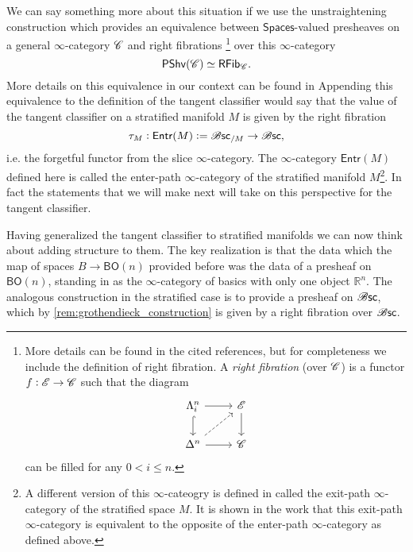 \documentclass[../text]{subfiles}
\begin{document}
\begin{remark}\label{rem:grothendieck_construction}
    We can say something more about this situation if we use the unstraightening construction \cite[sec.2.2]{lurie_htt} which provides an equivalence between $\mathsf{Spaces}$-valued presheaves on a general $\infty$-category $\mathscr{C}$ and right fibrations \footnote{More details can be found in the cited references, but for completeness we include the definition of right fibration. A \emph{right fibration} (over $\mathscr{C}$) is a functor $f:\mathscr{E} \rightarrow \mathscr{C}$ such that the diagram
    \begin{equation}
        \begin{tikzcd}[ampersand replacement=\&]
            \Lambda^n_i \arrow[r] \arrow[d, hook] \& \mathscr{E} \arrow[d] \\
            \Delta^n \arrow[r] \arrow[ru, dashed] \& \catC        
        \end{tikzcd}
    \end{equation}
    can be filled for any $0 < i \leq n$.} over this $\infty$-category
    \begin{equation}
        \mathsf{PShv}(\mathscr{C}) \simeq \mathsf{RFib}_{\mathscr{C}}.
    \end{equation}
    More details on this equivalence in our context can be found in \cite[sec.4.2]{aft_localstrut}
    Appending this equivalence to the definition of the tangent classifier would say that the value of the tangent classifier on a stratified manifold $M$ is given by the right fibration
    \begin{equation}
        \tau_M: \mathsf{Entr}(M) := \mathscr{B} \mathsf{sc}_{/M} \rightarrow \mathscr{B} \mathsf{sc},
    \end{equation}
    i.e. the forgetful functor from the slice $\infty$-category. The $\infty$-category $\mathsf{Entr}(M)$ defined here is called the enter-path $\infty$-category of the stratified manifold $M$\footnote{A different version of this $\infty$-cateogry is defined in \cite[app.A.6]{lurie_ha} called the exit-path $\infty$-category of the stratified space $M$. It is shown in the work \cite{afr_homhyp} that this exit-path $\infty$-category is equivalent to the opposite of the enter-path $\infty$-category as defined above.}. In fact the statements that we will make next will take on this perspective for the tangent classifier.
\end{remark}

Having generalized the tangent classifier to stratified manifolds we can now think about adding structure to them. The key realization is that the data which the map of spaces $B \rightarrow \mathsf{BO}(n)$ provided before was the data of a presheaf on $\mathsf{BO}(n)$, standing in as the $\infty$-category of basics with only one object $\mathbb{R}^n$. The analogous construction in the stratified case is to provide a presheaf on $\mathscr{B} \mathsf{sc}$, which by \cref{rem:grothendieck_construction} is given by a right fibration over $\mathscr{B} \mathsf{sc}$. 
\end{document}

